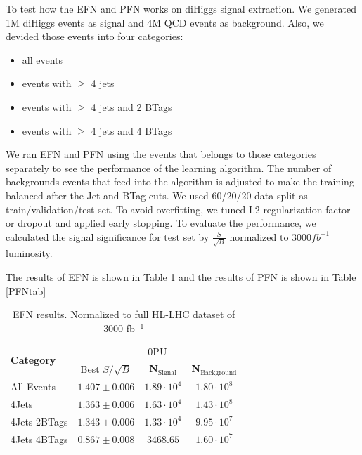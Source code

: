 To test how the EFN and PFN works on diHiggs signal extraction. We generated 1M diHiggs events as signal and 4M QCD events as background. Also, we devided those events into four categories:
\begin{itemize}
    \item all events
    \item events with $ \geq $ 4 jets
    \item events with $ \geq $ 4 jets and 2 BTags
    \item events with $ \geq $ 4 jets and 4 BTags
\end{itemize}
We ran EFN and PFN using the events that belongs to those categories separately to see the performance of the learning algorithm. The number of backgrounds events that feed into the algorithm is adjusted to make the training balanced after the Jet and BTag cuts.
We used 60/20/20 data split as train/validation/test set.
To avoid overfitting, we tuned L2 regularization factor or dropout and applied early stopping.
To evaluate the performance, we calculated the signal significance for test set by $\frac{S}{\sqrt{B}}$ normalized to $3000fb^{-1}$ luminosity.

The results of EFN is shown in Table \ref{EFNtab} and the results of PFN is shown in Table \ref{PFNtab}
\begin{table}[ht!]
\centering
    \begin{tabular}{|l|c|c|c|} %
      \hline\hline
      \multirow{2}{*}{\textbf{Category}} & \multicolumn{3}{c|}{0PU}\\
      \cline{2-4}
      & Best $S/\sqrt{B}$ & \textbf{N$_{\mathrm{Signal}}$} & \textbf{N$_{\mathrm{Background}}$} \\
      \hline
      All Events & $1.407 \pm 0.006$ & $1.89\cdot 10^4$ & $1.80\cdot 10^8$ \\
      4Jets & $1.363 \pm 0.006$ & $1.63\cdot 10^4$ & $1.43\cdot 10^8$ \\
      4Jets 2BTags & $1.343 \pm 0.006$ & $1.33\cdot 10^4$ & $9.95\cdot 10^7$ \\
      4Jets 4BTags & $0.867 \pm 0.008$ & $3468.65$ & $1.60\cdot 10^7$ \\
      \hline\hline
    \end{tabular}
    \caption{EFN results. Normalized to full HL-LHC dataset of 3000 fb$^{-1}$}
\label{EFNtab}
\end{table}

